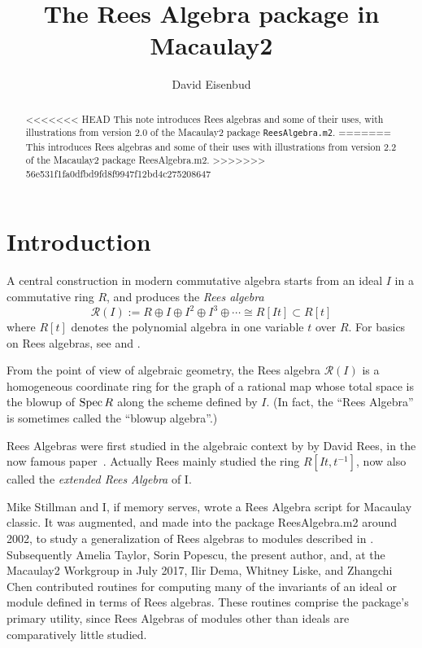 \documentclass[twoside,12pt, leqno]{amsart}
\author{David Eisenbud}
\title{The Rees Algebra package in Macaulay2}
\def\RR{{\mathcal R}}
\def\Spec{{{\rm Spec}\,}}
\begin{document}
\begin{abstract}
<<<<<<< HEAD
This note introduces Rees algebras and some of their uses, with illustrations from version 2.0 of the Macaulay2 \cite{M2} package {\tt ReesAlgebra.m2}.
=======
This introduces Rees algebras and some of their uses with illustrations from version 2.2 of the Macaulay2 package ReesAlgebra.m2.
>>>>>>> 56e531f1fa0dfbd9fd8f9947f12bd4c275208647
\end{abstract}

\maketitle

\section*{Introduction}
A central construction in modern commutative algebra starts from
an ideal $I$ in a commutative ring $R$, and produces the \emph{Rees algebra}
$$
\RR(I) :=  R\oplus I\oplus I^2\oplus I^3\oplus\cdots \cong R[It]\subset R[t]
$$ 
where $R[t]$ denotes the polynomial algebra in one variable $t$ over $R$. For basics on Rees algebras, see \cite{V} and \cite{SW}.

From the point of view of algebraic geometry, the Rees algebra $\RR(I)$ is a homogeneous
coordinate ring for the graph of a rational map whose total space is the blowup
of $\Spec R$ along the scheme defined by $I$.
 (In fact, the  ``Rees Algebra'' is sometimes called the ``blowup algebra''.)  
     

     Rees Algebras were first studied in the algebraic context by
      by David Rees, in the
     now famous paper~\cite{Rees}. Actually
     Rees mainly studied the ring 
     $R[It,t^{-1}]$, now also called the \emph{extended Rees
     Algebra} of I. 
     
Mike Stillman and I, if memory serves, wrote a Rees Algebra script for Macaulay classic. It was augmented, and made into the package ReesAlgebra.m2  around 2002,  to study a generalization of Rees algebras to modules described in \cite{EHU}. Subsequently
Amelia Taylor, 
Sorin Popescu, the present author,
and, at the Macaulay2 Workgroup in July 2017, 
Ilir Dema,
Whitney Liske, and
Zhangchi Chen
contributed routines
for computing many of the invariants of an ideal or module
defined in terms of Rees algebras. These routines comprise the package's primary utility, since Rees Algebras
of modules other than ideals are comparatively little studied. 
\end{document}
